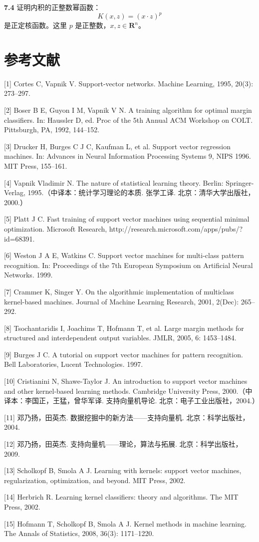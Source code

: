 \documentclass[UTF8, 12pt, fontset=fandol, oneside]{ctexart}
\begin{document}
\noindent\textbf{7.4}\quad
证明内积的正整数幂函数：
\[
K(x,z)=(x\cdot z)^p
\]
是正定核函数。这里 $p$ 是正整数，$x,z\in\mathbf{R}^n$。

\section*{参考文献}

[1] Cortes C, Vapnik V. Support-vector networks. Machine Learning, 1995, 20(3): 273--297.

[2] Boser B E, Guyon I M, Vapnik V N. A training algorithm for optimal margin classifiers. In: Haussler D, ed. Proc of the 5th Annual ACM Workshop on COLT. Pittsburgh, PA, 1992, 144--152.

[3] Drucker H, Burges C J C, Kaufman L, et al. Support vector regression machines. In: Advances in Neural Information Processing Systems 9, NIPS 1996. MIT Press, 155--161.

[4] Vapnik Vladimir N. The nature of statistical learning theory. Berlin: Springer-Verlag, 1995.（中译本：统计学习理论的本质. 张学工译. 北京：清华大学出版社，2000.）

[5] Platt J C. Fast training of support vector machines using sequential minimal optimization. Microsoft Research, http://research.microsoft.com/apps/pubs/?id=68391.

[6] Weston J A E, Watkins C. Support vector machines for multi-class pattern recognition. In: Proceedings of the 7th European Symposium on Artificial Neural Networks. 1999.

[7] Crammer K, Singer Y. On the algorithmic implementation of multiclass kernel-based machines. Journal of Machine Learning Research, 2001, 2(Dec): 265--292.

[8] Tsochantaridis I, Joachims T, Hofmann T, et al. Large margin methods for structured and interdependent output variables. JMLR, 2005, 6: 1453--1484.

[9] Burges J C. A tutorial on support vector machines for pattern recognition. Bell Laboratories, Lucent Technologies. 1997.

[10] Cristianini N, Shawe-Taylor J. An introduction to support vector machines and other kernel-based learning methods. Cambridge University Press, 2000.（中译本：李国正，王猛，曾华军译. 支持向量机导论. 北京：电子工业出版社，2004.）

[11] 邓乃扬，田英杰. 数据挖掘中的新方法——支持向量机. 北京：科学出版社，2004.

[12] 邓乃扬，田英杰. 支持向量机——理论，算法与拓展. 北京：科学出版社，2009.

[13] Scholkopf B, Smola A J. Learning with kernels: support vector machines, regularization, optimization, and beyond. MIT Press, 2002.

[14] Herbrich R. Learning kernel classifiers: theory and algorithms. The MIT Press, 2002.

[15] Hofmann T, Scholkopf B, Smola A J. Kernel methods in machine learning. The Annals of Statistics, 2008, 36(3): 1171--1220.
\end{document}
